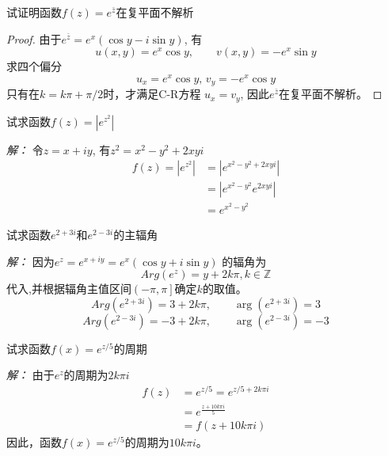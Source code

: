 \begin{example}
  试证明函数$f(z) = e^{\bar{z}}$在复平面不解析
\end{example}
\begin{proof}
  由于$e^{\bar{z}} = e^x(\cos y - i \sin y)$, 有
  \[ u(x,y) = e^x \cos y, \qquad v(x,y) = - e^x \sin y \]
  求四个偏分
  \[ u_x = e^x \cos y,\, v_y = -  e^x \cos y\]
  只有在$k=k \pi + \pi /2 $时，才满足C-R方程 $u_x = v_y$, 因此$e^{\bar{z}}$在复平面不解析。 
\end{proof}

\begin{example}
  试求函数$f(z) = |e^{z^2}|$
\end{example}
\emph{解：} 令$z = x+ iy $, 有$z^2 = x^2 - y^2 + 2xyi$
\[ \begin{aligned}
  f(z) = |e^{z^2}| & = |e^{x^2 - y^2 + 2xyi}|  \\
  & = |e^{x^2 - y^2 } e^{2xyi}| \\
  & = e^{x^2 - y^2 } 
\end{aligned}\]

\begin{example}
  试求函数$e^{2+3i}$和$e^{2-3i}$的主辐角
\end{example}
\emph{解：} 因为$e^z = e^{x+ iy} = e^x(\cos y + i \sin y) $ 的辐角为
\[Arg (e^z) = y + 2k\pi, k \in \mathbb{Z} \]
代入,并根据辐角主值区间$\left(- \pi, \pi\right]$确定$k$的取值。 
\[Arg (e^{2+3i}) = 3 + 2k\pi, \qquad \arg (e^{2+3i}) = 3 \]
\[Arg (e^{2-3i}) = -3 + 2k\pi, \qquad \arg (e^{2-3i}) = -3 \]

\begin{example}
  试求函数$f(x) = e^{z/5}$的周期
\end{example}
\emph{解：} 由于$e^z$的周期为$2k\pi i$ 
\[ \begin{aligned}
  f(z) & =  e^{z/5} =  e^{z/5 + 2k\pi i}  \\
     & =  e^{\frac{z + 10k\pi i}{5}}  \\
     & = f(z+10k \pi i)
\end{aligned}\]
因此，函数$f(x) = e^{z/5}$的周期为$10k \pi i$。

